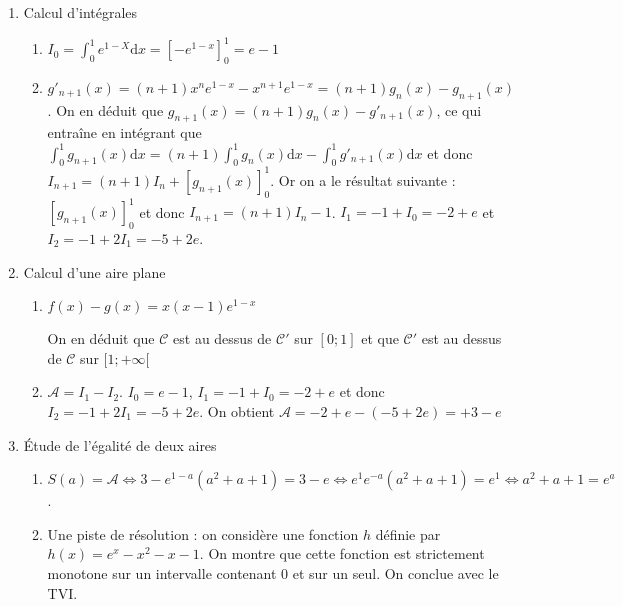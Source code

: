 \documentclass[12pt,a4paper,french]{article}
\begin{document}
\begin{solution}
  \begin{enumerate}
    \item Calcul d'intégrales
    \begin{enumerate}
      \item $I_0 = \int_0^1 e^{1 - X}\mathrm{d}x = \left[-e^{1 -
        x}\right]_0^1 = e - 1$
      \item $g'_{n+1}(x) = (n+1)x^ne^{1-x} - x^{n+1}e^{1-x} =
        (n+1)g_n(x) - g_{n+1}(x)$. On en déduit que $g_{n+1}(x) =
        (n+1)g_n(x) - g'_{n+1}(x)$, ce qui entraîne en intégrant que
        $\int_0^1 g_{n+1}(x)\mathrm{d}x = (n+1)\int_0^1
        g_n(x)\mathrm{d}x - \int_0^1 g'_{n+1}(x)\mathrm{d}x$ et donc
        $I_{n+1} = (n+1)I_n + \left[g_{n+1}(x)\right]_0^1$. Or on a le
        résultat suivante : $\left[g_{n+1}(x)\right]_0^1$ et donc
        $I_{n+1} = (n+1)I_n -1$. $I_1 = -1 + I_0 = -2 + e$ et $I_2 = -1
        + 2I_1 = -5 +2e$.
    \end{enumerate}
  \item Calcul d'une aire plane
    \begin{enumerate}
      \item $f(x) - g(x) = x(x-1)e^{1-x}$
        \begin{center}
        \end{center}
        On en déduit que $\mathcal{C}$ est au dessus de $\mathcal{C}'$
        sur $[0;1]$ et que $\mathcal{C}'$ est au dessus de $\mathcal{C}$
        sur $[1;+\infty[$
      \item $\mathcal{A} = I_1 - I_2$. $I_0 = e - 1$, $I_1 = -1 +
        I_0 = -2 + e$ et donc $I_2 = -1 + 2I_1 = -5 +2e$.
        On obtient $\mathcal{A} =  -2 + e -(-5 +2e) = +3 -e$
    \end{enumerate}
  \item Étude de l'égalité de deux aires
    \begin{enumerate}
      \item $S(a) = \mathcal{A} \iff 3 - e^{1-a}(a^2 + a + 1) = 3 -
        e \iff e^1e^{-a}(a^2 + a + 1) = e^1 \iff a^2 + a + 1 = e^a$.
      \item Une piste de résolution : on considère une fonction $h$
        définie par $h(x) = e^x - x^2 - x - 1$. On montre que cette
        fonction est strictement monotone sur un intervalle
        contenant 0 et sur un seul. On conclue avec le TVI.
    \end{enumerate}
\end{enumerate}
\end{solution}
\end{document}
